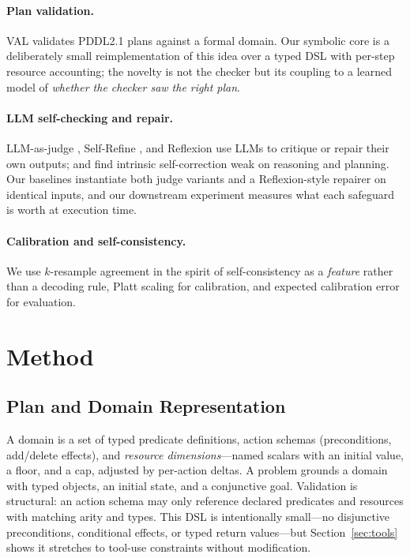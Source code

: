 \documentclass[letterpaper]{article}
\begin{document}
\paragraph{Plan validation.}
\textsc{VAL} \citep{howey2004val} validates PDDL2.1 \citep{fox2003pddl21}
plans against a formal domain. Our symbolic core is a deliberately small
reimplementation of this idea over a typed DSL with per-step resource
accounting; the novelty is not the checker but its coupling to a learned
model of \emph{whether the checker saw the right plan}.

\paragraph{LLM self-checking and repair.}
LLM-as-judge \citep{zheng2023judging}, Self-Refine \citep{madaan2023selfrefine},
and Reflexion \citep{shinn2023reflexion} use LLMs to critique or repair their
own outputs; \citet{huang2024cannot} and \citet{stechly2024selfverification}
find intrinsic self-correction weak on reasoning and planning. Our baselines
instantiate both judge variants and a Reflexion-style repairer on identical
inputs, and our downstream experiment measures what each safeguard is worth
at execution time.

\paragraph{Calibration and self-consistency.}
We use $k$-resample agreement in the spirit of self-consistency
\citep{wang2023selfconsistency} as a \emph{feature} rather than a decoding
rule, Platt scaling \citep{platt1999} for calibration, and expected
calibration error \citep{naeini2015ece,guo2017calibration} for evaluation.

\section{Method}

\subsection{Plan and Domain Representation}

A domain is a set of typed predicate definitions, action schemas
(preconditions, add/delete effects), and \emph{resource dimensions}---named
scalars with an initial value, a floor, and a cap, adjusted by per-action
deltas. A problem grounds a domain with typed objects, an initial state, and
a conjunctive goal. Validation is structural: an action schema may only
reference declared predicates and resources with matching arity and types.
This DSL is intentionally small---no disjunctive preconditions, conditional
effects, or typed return values---but Section~\ref{sec:tools} shows it
stretches to tool-use constraints without modification.
\end{document}

